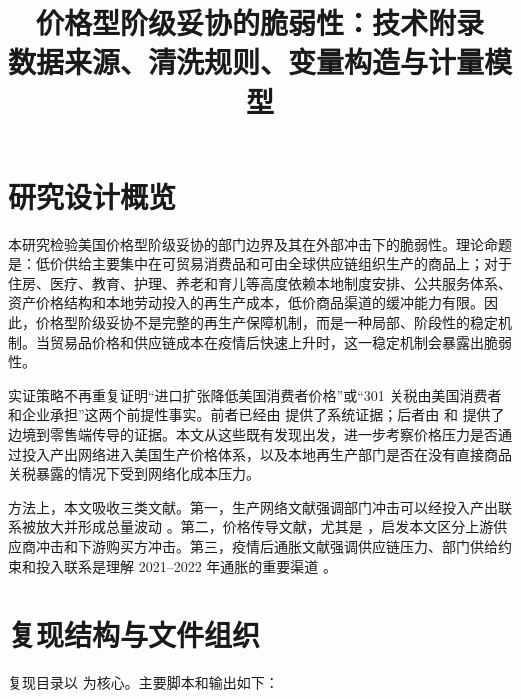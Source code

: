 \documentclass[12pt,a4paper,fontset=none]{ctexart}
\title{\heiti 价格型阶级妥协的脆弱性：技术附录\\
\large 数据来源、清洗规则、变量构造与计量模型}
\author{}
\date{}
\begin{document}
\maketitle

\section{研究设计概览}

本研究检验美国价格型阶级妥协的部门边界及其在外部冲击下的脆弱性。理论命题是：低价供给主要集中在可贸易消费品和可由全球供应链组织生产的商品上；对于住房、医疗、教育、护理、养老和育儿等高度依赖本地制度安排、公共服务体系、资产价格结构和本地劳动投入的再生产成本，低价商品渠道的缓冲能力有限。因此，价格型阶级妥协不是完整的再生产保障机制，而是一种局部、阶段性的稳定机制。当贸易品价格和供应链成本在疫情后快速上升时，这一稳定机制会暴露出脆弱性。

实证策略不再重复证明“进口扩张降低美国消费者价格”或“301 关税由美国消费者和企业承担”这两个前提性事实。前者已经由 \citet{jaravel2019trade} 提供了系统证据；后者由 \citet{amiti2020tariffs} 和 \citet{cavallo2021tariff} 提供了边境到零售端传导的证据。本文从这些既有发现出发，进一步考察价格压力是否通过投入产出网络进入美国生产价格体系，以及本地再生产部门是否在没有直接商品关税暴露的情况下受到网络化成本压力。

方法上，本文吸收三类文献。第一，生产网络文献强调部门冲击可以经投入产出联系被放大并形成总量波动 \citep{acemoglu2012network}。第二，价格传导文献，尤其是 \citet{luo2023propagation}，启发本文区分上游供应商冲击和下游购买方冲击。第三，疫情后通胀文献强调供应链压力、部门供给约束和投入联系是理解 2021--2022 年通胀的重要渠道 \citep{baqaee2022supply,digiovanni2022gscpi,pasten2020monetary}。

\section{复现结构与文件组织}

复现目录以  为核心。主要脚本和输出如下：
\end{document}
